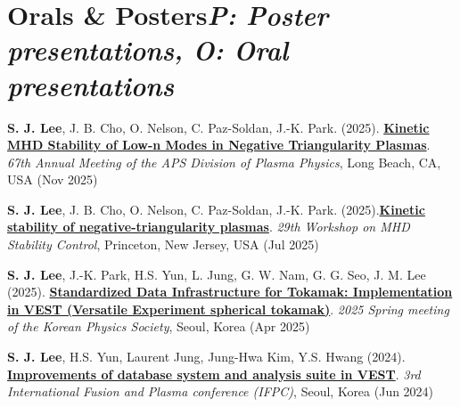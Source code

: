 \documentclass[a4paper,12pt]{extarticle}
\begin{document}
\section*{\textbf{Orals \& Posters}\hfill {\scriptsize \textit{P: Poster presentations, O: Oral presentations}}}
\small{
  
\begin{enumerate}[leftmargin=*, labelsep=0.5em, align=left, widest={[\textbf{S.1}]}, itemindent=0em, label={\textbf{[\arabic*]}}]

\item[\textbf{[P.1]}] \textbf{S. J. Lee}, J. B. Cho, O. Nelson, C. Paz-Soldan, J.-K. Park. (2025). \href{https://satelite2517.github.io/files/2025_Nov_APS-DPP.pdf}{\textbf{Kinetic MHD Stability of Low-n Modes in Negative Triangularity Plasmas}}.  
\textit{67th Annual Meeting of the APS Division of Plasma Physics}, Long Beach, CA, USA (Nov 2025) 

\item[\textbf{[P.2]}] \textbf{S. J. Lee}, J. B. Cho, O. Nelson, C. Paz-Soldan, J.-K. Park. (2025).\href{https://satelite2517.github.io/files/2025_Jul_MHD_workshop.pdf}{\textbf{Kinetic stability of negative-triangularity plasmas}}. 
\textit{29th Workshop on MHD Stability Control}, Princeton, New Jersey, USA (Jul 2025)

\item[\textbf{[P.3]}] \textbf{S. J. Lee}, J.-K. Park, H.S. Yun, L. Jung, G. W. Nam, G. G. Seo, J. M. Lee (2025). \href{https://satelite2517.github.io/files/2025_Apr_KPS.pdf}{\textbf{Standardized Data Infrastructure for Tokamak: Implementation in VEST (Versatile Experiment spherical tokamak)}}. 
\textit{2025 Spring meeting of the Korean Physics Society}, Seoul, Korea (Apr 2025)

\item[\textbf{[P.4]}] \textbf{S. J. Lee}, H.S. Yun, Laurent Jung, Jung-Hwa Kim, Y.S. Hwang (2024). \href{https://satelite2517.github.io/files/2024_Jun_IFPC.pdf}{\textbf{Improvements of database system and analysis suite in VEST}}. 
\textit{3rd International Fusion and Plasma conference (IFPC)}, Seoul, Korea (Jun 2024)

\end{enumerate}
}

\end{document}
